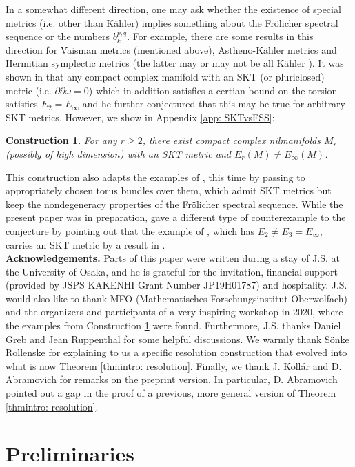 \documentclass[12pt,reqno]{amsart}
\newtheorem{constr}{Construction}
\theoremstyle{definition}
\newcommand{\del}{\partial}
\newcommand{\delbar}{\bar{\del}}
\begin{document}
In a somewhat different direction, one may ask whether the existence of special metrics (i.e. other than K\"ahler) implies something about the Fr\"olicher spectral sequence or the numbers $b_k^{p,q}$. For example, there are some results in this direction for Vaisman metrics (mentioned above), Astheno-K\"ahler metrics \cite{JY93, CR22} and Hermitian symplectic metrics \cite{Cav20} (the latter may or may not be all K\"ahler \cite{ST10}). It was shown in \cite{Pop19} that any compact complex manifold with an SKT (or pluriclosed) metric (i.e. $\del\delbar\omega=0$) which in addition satisfies a certian bound on the torsion satisfies $E_2=E_\infty$ and he further conjectured that this may be true for arbitrary SKT metrics. However, we show in Appendix \ref{app: SKTvsFSS}:
\begin{constr}\label{constr: FSSvsSKT}
For any $r\geq 2$, there exist compact complex nilmanifolds $M_r$ (possibly of high dimension) with an SKT metric and $E_r(M)\neq E_\infty(M)$.
\end{constr}
This construction also adapts the examples of \cite{BR14}, this time by passing to appropriately chosen torus bundles over them, which admit SKT metrics but keep the nondegeneracy properties of the Fr\"olicher spectral sequence. While the present paper was in preparation, \cite{LUV22} gave a different type of counterexample to the conjecture by pointing out that the example of \cite{Pit89}, which has $E_2\neq E_3=E_\infty$, carries an SKT metric by a result in \cite{AI03}.\\

\textbf{Acknowledgements.}
Parts of this paper were written during a stay of J.S. at the University of Osaka, and he is grateful for the invitation, financial support (provided by JSPS KAKENHI Grant Number JP19H01787) and hospitality. J.S. would also like to thank MFO (Mathematisches Forschungsinstitut Oberwolfach) and the organizers and participants of a very inspiring workshop in 2020, where the examples from Construction \ref{constr: FSSvsSKT} were found. Furthermore, J.S. thanks Daniel Greb and Jean Ruppenthal for some helpful discussions. We warmly thank Sönke Rollenske for explaining to us a specific resolution construction that evolved into what is now Theorem \ref{thmintro: resolution}. Finally, we thank J. Koll\'ar and D. Abramovich for remarks on the preprint version. In particular, D. Abramovich pointed out a gap in the proof of a previous, more general version of Theorem \ref{thmintro: resolution}.
\section{Preliminaries}
\end{document}
